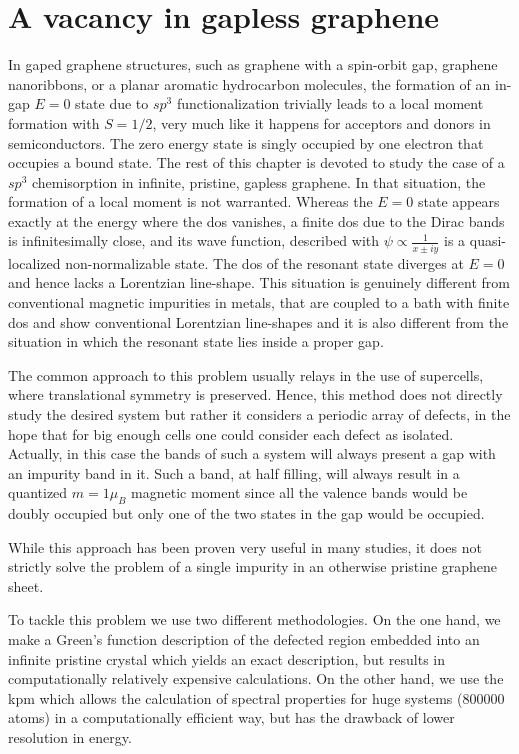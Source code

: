 \section{A vacancy in gapless graphene}
In gaped graphene structures, such as graphene with a spin-orbit gap,\cite{Gonzalez2012} graphene nanoribbons,\cite{Palacios2008} or a planar aromatic hydrocarbon molecules, the formation of an in-gap $E=0$ state due to $sp^3$ functionalization trivially leads to a local moment formation with $S=1/2$, very much like it happens for acceptors and donors in semiconductors.
The zero energy state is singly occupied by one electron that occupies a bound state.
The rest of this chapter is devoted to study the case of a $sp^3$ chemisorption in infinite, pristine, gapless graphene.
In that situation, the formation of a local moment is not warranted. Whereas the $E=0$ state appears exactly at the energy where the \ac{dos} vanishes, a finite \ac{dos} due to the Dirac bands is infinitesimally close, and its wave function, described with $\psi\propto\frac{1}{x\pm i y}$ is a quasi-localized non-normalizable state.\cite{Pereira2006}
The \ac{dos} of the resonant state diverges at $E=0$ and hence lacks a Lorentzian line-shape.   %
This situation is genuinely different from conventional magnetic impurities in metals, that are coupled to a bath with finite \ac{dos} and show conventional Lorentzian line-shapes and it is also different from the situation in which the resonant state lies inside a proper gap.

The common approach to this problem usually relays in the use of supercells, where translational symmetry is preserved.\cite{Duplock2004,Boukhvalov2008,Yazyev2010,Sofo2012,Brihuega2016,zhou2009}
Hence, this method does not directly study the desired system but rather it considers a periodic array of defects, in the hope that for big enough cells one could consider each defect as isolated.
Actually, in this case the bands of such a system will always present a gap with an impurity band in it. Such a band, at half filling, will always result in a quantized $m=1\mu_B$ magnetic moment since all the valence bands would be doubly occupied but only one of the two states in the gap would be occupied.

While this approach has been proven very useful in many studies, it does not strictly solve the problem of a single impurity in an otherwise pristine graphene sheet.

To tackle this problem we use two different methodologies. On the one hand, we make a Green's function description of the defected region embedded into an infinite pristine crystal which yields an exact description, but results in computationally relatively expensive calculations. On the other hand, we use the \acf{kpm} which allows the calculation of spectral properties for huge systems (800000 atoms) in a computationally efficient way, but has the drawback of lower resolution in energy.




